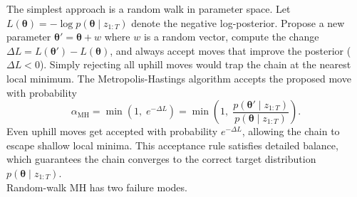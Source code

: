 \documentclass{article}
\renewcommand{\v}[1]{ \ensuremath{ {\mathbf{#1}} }}
\begin{document}
The simplest approach is a random walk in parameter space. Let $L(\v\theta) = -\log p(\v\theta \mid z_{1:T})$ denote the negative log-posterior. Propose a new parameter $\v \theta' = \v \theta + w$ where $w$ is a random vector, compute the change $\Delta L = L(\v \theta') - L(\v \theta)$, and always accept moves that improve the posterior ($\Delta L < 0$). Simply rejecting all uphill moves would trap the chain at the nearest local minimum. The Metropolis-Hastings algorithm \cite{Metropolis1953} accepts the proposed move with probability
\begin{equation}
    \alpha_{\mathrm{MH}} = \min\!\left(1,\; e^{-\Delta L}\right) = \min\!\left(1,\; \frac{p(\v \theta' \mid z_{1:T})}{p(\v \theta \mid z_{1:T})}\right).
    \label{eq:mh-acceptance}
\end{equation}
Even uphill moves get accepted with probability $e^{-\Delta L}$, allowing the chain to escape shallow local minima. This acceptance rule satisfies detailed balance, which guarantees the chain converges to the correct target distribution $p(\v \theta \mid z_{1:T})$. \\[6pt]
Random-walk MH has two failure modes.
\end{document}
